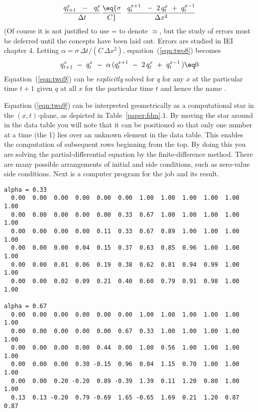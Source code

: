 \par
\begin{equation}
{ q_{{t+1}}^x \ \ -\ \ q_t^x   \over  \Delta t } \eq
{ \sigma  \over  C }
\ \ { q_t^{{x+1}}\ \ -\ 2\,q_t^x \ +\  q_t^{{x-1}}  
        \over  \Delta x^2 }
\label{eqn:two8}
\end{equation}
(Of course it is not justified to use
= to denote $ \approx $,
but the study of errors must be deferred until the concepts
have been laid out.
Errors are studied in IEI chapter 4.
Letting $\alpha = \sigma \, \Delta t / ( C\, \Delta x^2 )$,
equation~(\ref{eqn:two8}) becomes
\begin{equation}
q_{{t+1}}^x\ -\ q_t^x \ -\ \alpha \, ( q_t^{{x+1}}\ -\ 2\,q_t^x
\ +\ q_t^{{x-1}} \, ) \eq 0
\label{eqn:two9}
\end{equation}
Equation~(\ref{eqn:two9}) can be {\em  explicitly} solved for
$q$ for any $x$ at the particular time $t+1$
given $q$ at all $x$ for the particular time $t$
and hence the name {\em  {}}.
\par
Equation (\ref{eqn:two9}) can be interpreted geometrically
as a computational
star in the $(x,t)$-plane, as depicted in Table~\ref{paper:fdm}.1.
By moving the star around in the data table
you will note that it
can be positioned so that only one number at a time (the 1)
lies over an unknown element in the data table.
This enables the computation of subsequent rows
beginning from the top.
By doing this you are solving
the partial-differential equation by the
finite-difference method.
There are many possible arrangements
of initial and side conditions,
such as zero-value side conditions.
Next is a computer program for the job and its result.
\begin{verbatim}
alpha = 0.33
  0.00  0.00  0.00  0.00  0.00  0.00  1.00  1.00  1.00  1.00  1.00  1.00
  0.00  0.00  0.00  0.00  0.00  0.33  0.67  1.00  1.00  1.00  1.00  1.00
  0.00  0.00  0.00  0.00  0.11  0.33  0.67  0.89  1.00  1.00  1.00  1.00
  0.00  0.00  0.00  0.04  0.15  0.37  0.63  0.85  0.96  1.00  1.00  1.00
  0.00  0.00  0.01  0.06  0.19  0.38  0.62  0.81  0.94  0.99  1.00  1.00
  0.00  0.00  0.02  0.09  0.21  0.40  0.60  0.79  0.91  0.98  1.00  1.00

alpha = 0.67
  0.00  0.00  0.00  0.00  0.00  0.00  1.00  1.00  1.00  1.00  1.00  1.00
  0.00  0.00  0.00  0.00  0.00  0.67  0.33  1.00  1.00  1.00  1.00  1.00
  0.00  0.00  0.00  0.00  0.44  0.00  1.00  0.56  1.00  1.00  1.00  1.00
  0.00  0.00  0.00  0.30 -0.15  0.96  0.04  1.15  0.70  1.00  1.00  1.00
  0.00  0.00  0.20 -0.20  0.89 -0.39  1.39  0.11  1.20  0.80  1.00  1.00
  0.13  0.13 -0.20  0.79 -0.69  1.65 -0.65  1.69  0.21  1.20  0.87  0.87
\end{verbatim}
\begin{comment}
\par
\listing               {heat/heatex.r}
\par
\listing               {heat/heatex.2tex}
\end{comment}
